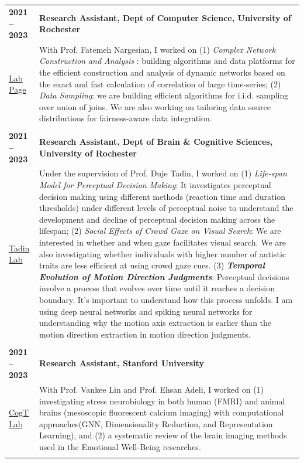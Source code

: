 \documentclass[10pt,letterpaper]{article}
\begin{document}
\begin{xltabular}{\textwidth}{@{}l X@{}}
\textbf{2021 -- 2023} & \textbf{Research Assistant, Dept of Computer Science, University of Rochester} \\
 \href{https://fnargesian.com/}{Lab Page} & With Prof. Fatemeh Nargesian, I worked on (1) \textit{Complex Network Construction}   \textit{and Analysis }: building algorithms and data platforms for the efficient construction   and analysis of dynamic networks based on the exact and fast calculation of correlation of   large
time-series; (2) \textit{Data Sampling}: we are building efficient algorithms for i.i.d.   sampling over union of joins. We are also working on tailoring data source distributions for fairness-aware data integration.
\\
\\
\textbf{2021 -- 2023} & \textbf{Research Assistant, Dept of Brain \& Cognitive Sciences, University of Rochester} \\
 \href{https://www2.bcs.rochester.edu/sites/duje/}{Tadin Lab} & Under the supervision of Prof. Duje Tadin, I worked on (1) \textit{Life-span Model for}   \textit{ Perceptual Decision Making}: It investigates perceptual decision making using different   methods (reaction time and duration thresholds)  under different levels of perceptual     noise to understand the development and decline of perceptual decision making across   the lifespan;  (2)\textit{ Social Effects of Crowd Gaze on Visual Search}: We are interested in  whether and when gaze facilitates visual search. We are also investigating whether   individuals with higher number of autistic traits are less efficient at using crowd gaze cues.   (3) \textit{\textbf{Temporal Evolution of Motion Direction Judgments}}: Perceptual decisions involve   a process that evolves over time until it reaches a decision boundary. It's important to   understand how this process unfolds. I am using deep neural networks and spiking  neural networks for understanding why the motion axis extraction is earlier than   the motion direction extraction in motion direction judgments. 
 
 \\
\\

\textbf{2021 -- 2023} & \textbf{Research Assistant, Stanford University} \\

 \href{https://cogtlab.stanford.edu/}{CogT Lab} & With Prof. Vankee Lin and Prof. Ehsan Adeli, I worked on (1) investigating stress   neurobiology in both human (FMRI) and animal brains (mesoscopic fluorescent calcium   imaging) with computational approaches(GNN, Dimensionality Reduction, and Representation Learning), and (2) a systematic review of the brain imaging methods used in the   Emotional Well-Being researches.
\\
\\



\end{xltabular}
\end{document}
